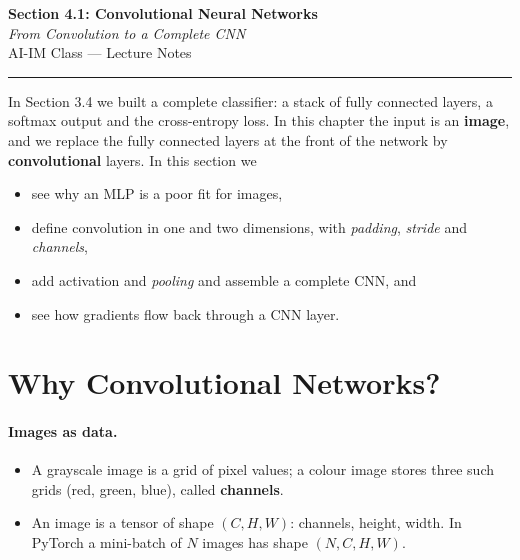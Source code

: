 \documentclass[12pt, a4paper]{article}
\begin{document}
\begin{center}
  {\LARGE \textbf{Section 4.1: Convolutional Neural Networks}} \\[0.3em]
  {\large\itshape From Convolution to a Complete CNN} \\[0.5em]
  {\large AI-IM Class --- Lecture Notes}%
  \ifstudentmode
  \fi
\end{center}

\vspace{1em}
\hrule
\vspace{1.5em}

In Section 3.4 we built a complete classifier: a stack of fully connected
layers, a softmax output and the cross-entropy loss. In this chapter the
input is an \textbf{image}, and we replace the fully connected layers at the
front of the network by \textbf{convolutional} layers. In this section we
\begin{itemize}[nosep]
  \item see why an MLP is a poor fit for images,
  \item define convolution in one and two dimensions, with \emph{padding},
        \emph{stride} and \emph{channels},
  \item add activation and \emph{pooling} and assemble a complete CNN, and
  \item see how gradients flow back through a CNN layer.
\end{itemize}

\section{Why Convolutional Networks?}
\label{sec:why}

\paragraph{Images as data.}
\begin{itemize}[nosep]
  \item A grayscale image is a grid of pixel values; a colour image stores
        three such grids (red, green, blue), called \textbf{channels}.
  \item An image is a tensor of shape $(C, H, W)$: channels, height, width.
        In PyTorch a mini-batch of $N$ images has shape $(N, C, H, W)$.
\end{itemize}
\end{document}
